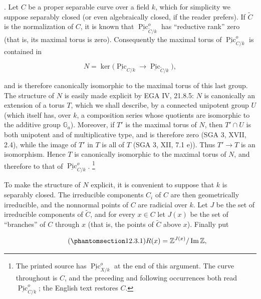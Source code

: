 \medskip
\noindent
{}. Let $C$ be a proper separable curve over a field $k$, which for
simplicity we suppose separably closed (or even algebraically closed, if
the reader prefers). If $\widetilde C$ is the normalization of $C$, it is
known that $\underline{\operatorname{Pic}}^o_{\widetilde C/k}$ has
``reductive rank'' zero (that is, its maximal torus is zero). Consequently
the maximal torus of $\underline{\operatorname{Pic}}^o_{C/k}$ is contained
in

\begin{equation*}
 N=\ker\bigl(\underline{\operatorname{Pic}}_{C/k}
       \longrightarrow\underline{\operatorname{Pic}}_{\widetilde C/k}\bigr),
\end{equation*}

\noindent
and is therefore canonically isomorphic to the maximal torus of this last
group. The structure of $N$ is easily made explicit by EGA IV, 21.8.5:
$N$ is canonically an extension of a torus $T$, which we shall describe,
by a connected unipotent group $U$ (which itself has, over $k$, a
composition series whose quotients are isomorphic to the additive group
$\mathbb G_a$). Moreover, if $T'$ is the maximal torus of $N$, then
$T'\cap U$ is both unipotent and of multiplicative type, and is therefore
zero (SGA 3, XVII, 2.4), while the image of $T'$ in $T$ is all of $T$
(SGA 3, XII, 7.1 e)). Thus $T'\to T$ is an isomorphism. Hence $T$ is
canonically isomorphic to the maximal torus of $N$, and therefore to that
of $\underline{\operatorname{Pic}}^o_{C/k}$.
\footnote{The printed source has $\underline{\operatorname{Pic}}^o_{X/k}$
at the end of this argument. The curve throughout  is $C$, and the
preceding and following occurrences both read
$\underline{\operatorname{Pic}}^o_{C/k}$; the English text restores $C$.}

To make the structure of $N$ explicit, it is convenient to suppose that
$k$ is separably closed. The irreducible components $C_i$ of $C$ are then
geometrically irreducible, and the nonnormal points of $C$ are radicial
over $k$. Let $J$ be the set of irreducible components of $\widetilde C$,
and for every $x\in C$ let $J(x)$ be the set of ``branches'' of $C$ through
$x$ (that is, the points of $\widetilde C$ above $x$). Finally put

\begin{equation}\tag{\SGARefTarget{sga7.sga7i.eix.n12-3-1}{12.3.1}}
 R(x)=\mathbb Z^{J(x)}/\operatorname{Im}\mathbb Z,
\end{equation}

